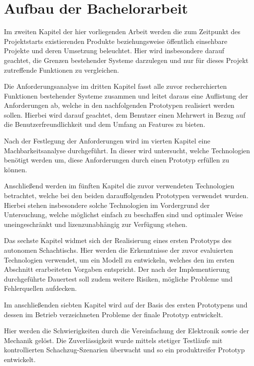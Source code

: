 \hypertarget{aufbau-der-bachelorarbeit}{%
\section{Aufbau der Bachelorarbeit}\label{aufbau-der-bachelorarbeit}}

Im zweiten Kapitel der hier vorliegenden Arbeit werden die zum Zeitpunkt
des Projektstarts existierenden Produkte beziehungsweise öffentlich
einsehbare Projekte und deren Umsetzung beleuchtet. Hier wird
insbesondere darauf geachtet, die Grenzen bestehender Systeme darzulegen
und nur für dieses Projekt zutreffende Funktionen zu vergleichen.

Die Anforderungsanalyse im dritten Kapitel fasst alle zuvor
recherchierten Funktionen bestehender Systeme zusammen und leitet daraus
eine Auflistung der Anforderungen ab, welche in den nachfolgenden
Prototypen realisiert werden sollen. Hierbei wird darauf geachtet, dem
Benutzer einen Mehrwert in Bezug auf die Benutzerfreundlichkeit und dem
Umfang an Features zu bieten.

Nach der Festlegung der Anforderungen wird im vierten Kapitel eine
Machbarkeitsanalyse durchgeführt. In dieser wird untersucht, welche
Technologien benötigt werden um, diese Anforderungen durch einen
Prototyp erfüllen zu können.

Anschließend werden im fünften Kapitel die zuvor verwendeten
Technologien betrachtet, welche bei den beiden darauffolgenden
Prototypen verwendet wurden. Hierbei stehen insbesondere solche
Technologien im Vordergrund der Untersuchung, welche möglichst einfach
zu beschaffen sind und optimaler Weise uneingeschränkt und
lizenzunabhängig zur Verfügung stehen.

Das sechste Kapitel widmet sich der Realisierung eines ersten Prototyps
des autonomen Schachtischs. Hier werden die Erkenntnisse der zuvor
evaluierten Technologien verwendet, um ein Modell zu entwickeln, welches
den im ersten Abschnitt erarbeiteten Vorgaben entspricht. Der nach der
Implementierung durchgeführte Dauertest soll zudem weitere Risiken,
mögliche Probleme und Fehlerquellen aufdecken.

Im anschließenden siebten Kapitel wird auf der Basis des ersten
Prototypens und dessen im Betrieb verzeichneten Probleme der finale
Prototyp entwickelt.

Hier werden die Schwierigkeiten durch die Vereinfachung der Elektronik
sowie der Mechanik gelöst. Die Zuverlässigkeit wurde mittels stetiger
Testläufe mit kontrollierten Schachzug-Szenarien überwacht und so ein
produktreifer Prototyp entwickelt.

